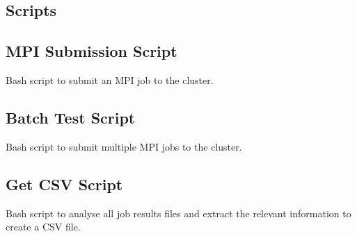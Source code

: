 \documentclass[12pt,oneside]{book} %
\begin{document}
\begin{subappendices}
    \section{Scripts}
    \subsection{MPI Submission Script} \label{appendix:mpi-sub}
    Bash script to submit an MPI job to the cluster.
    

    \newpage
    \subsection{Batch Test Script}\label{appendix:batch-test}
    Bash script to submit multiple MPI jobs to the cluster.
    

    \newpage
    \subsection{Get CSV Script}\label{appendix:get-csv}
    Bash script to analyse all job results files and extract the relevant
    information to create a CSV file. 

\end{subappendices}
\end{document}
